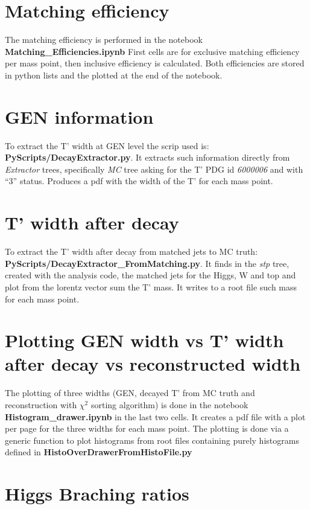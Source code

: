 \documentclass[11pt,a4paper]{article}
\begin{document}
\section{Matching efficiency}

The matching efficiency is performed in the notebook \textbf{Matching\_Efficiencies.ipynb} First cells are for exclusive matching efficiency per mass point, then inclusive efficiency is calculated. Both efficiencies are stored in python lists and the plotted at the end of the notebook.

\section{GEN information}

To extract the T' width at GEN level the scrip used is: \textbf{PyScripts/DecayExtractor.py}. It extracts such information directly from \textit{Extractor} trees, specifically \textit{MC} tree asking for the T' PDG id \textit{6000006} and with ``3'' status. Produces a pdf with the width of the T' for each mass point.

\section{T' width after decay}

To extract the T' width after decay from matched jets to MC truth:\\ \textbf{PyScripts/DecayExtractor\_FromMatching.py}. It finds in the \textit{stp} tree, created with the analysis code, the matched jets for the Higgs, W and top and plot from the lorentz vector sum the T' mass. It writes to a root file such mass for each mass point.

\section{Plotting GEN width vs T' width after decay vs reconstructed width}

The plotting of three widths (GEN, decayed T' from MC truth and reconstruction with $\chi^{2}$ sorting algorithm) is done in the notebook \textbf{Histogram\_drawer.ipynb} in the last two cells. It creates a pdf file with a plot per page for the three widths for each mass point. The plotting is done via a generic function to plot histograms from root files containing purely histograms defined in \textbf{HistoOverDrawerFromHistoFile.py}

\section{Higgs Braching ratios}
\end{document}
